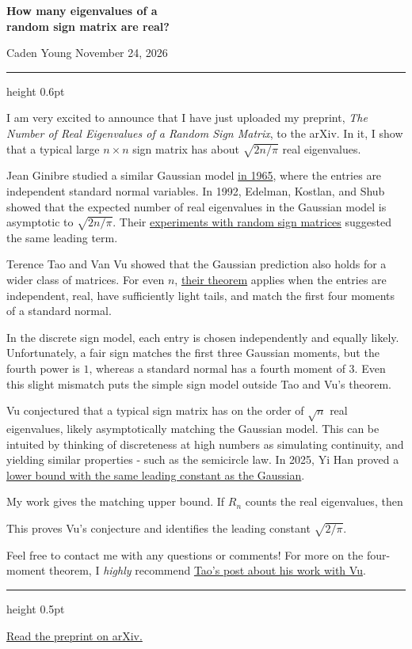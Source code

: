\documentclass[12pt,letterpaper]{article}
\newcommand{\resultline}[1]{%
    \par\noindent\begingroup\setlength{\fboxsep}{8pt}%
    \colorbox{tint}{\makebox[\dimexpr\linewidth-2\fboxsep\relax][c]{%
        \color{deepteal}\large$\displaystyle #1$}}\endgroup\par}
\begin{document}
\color{ink}
{\raggedright\color{deepteal}\fontsize{26}{28}\selectfont\bfseries
How many eigenvalues of a\\
random sign matrix are real?\par}
{\small\sffamily Caden Young \enspace\textperiodcentered\enspace November 24, 2026\par}
\vspace{4pt}
{\color{hairline}\hrule height 0.6pt}
\vspace{5pt}

I am very excited to announce that I have just uploaded my preprint,
\emph{The Number of Real Eigenvalues of a Random Sign Matrix}, to the arXiv.
In it, I show that a typical large $n\times n$ sign matrix has about
$\sqrt{2n/\pi}$ real eigenvalues.

Jean Ginibre studied a similar Gaussian model \href{https://doi.org/10.1063/1.1704292}{in 1965}, where the entries are independent standard normal variables. In 1992, Edelman, Kostlan, and Shub showed that the expected number of real eigenvalues in the Gaussian model is asymptotic to $\sqrt{2n/\pi}$. Their
\href{https://escholarship.org/content/qt3hw4q0wc/qt3hw4q0wc.pdf\#page=21}{experiments with random sign matrices}
suggested the same leading term.

Terence Tao and Van Vu showed that the Gaussian prediction also holds for a wider class of matrices. For even $n$, \href{https://arxiv.org/html/1206.1893v7}{their theorem} applies when the entries are independent, real, have sufficiently light tails, and match the first four moments of a standard normal. 

In the discrete sign model, each entry is chosen independently and equally likely. Unfortunately, a fair sign matches the first three Gaussian moments, but the fourth power is $1$, whereas a standard normal has a fourth moment of $3$. Even this slight mismatch puts the simple sign model outside Tao and Vu's theorem. 

Vu conjectured that a typical sign matrix has on the order of $\sqrt{n}$ real eigenvalues, likely asymptotically matching the Gaussian model. This can be intuited by thinking of discreteness at high numbers as simulating continuity, and yielding similar properties - such as the semicircle law. In 2025, Yi Han proved a \href{https://arxiv.org/html/2502.13819v2}{lower bound
with the same leading constant as the Gaussian}.

My work gives the matching upper bound. If $R_n$ counts the real eigenvalues,
then
\resultline{
  \frac{R_n}{\sqrt n}\longrightarrow\sqrt{\frac{2}{\pi}}\qquad\text{in }L^1.
}
This proves Vu's conjecture and identifies the leading constant $\sqrt{2/\pi}$.

Feel free to contact me with any questions or comments! For more on the four-moment
theorem, I \emph{highly} recommend
\href{https://terrytao.wordpress.com/2012/06/11/random-matrices-universality-of-local-spectral-statistics-of-non-hermitian-matrices/}{Tao's post about his work with Vu}.

{\color{hairline}\hrule height 0.5pt}\smallskip
{\footnotesize\sffamily
\href{https://arxiv.org/abs/2611.27245}{Read the preprint on arXiv.}\par}
\end{document}
